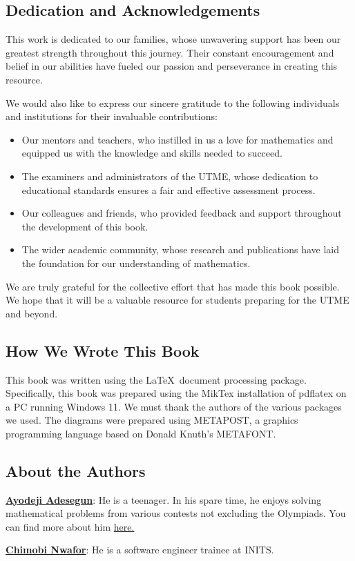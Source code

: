 \documentclass[a4paper]{book}
\begin{document}
\begin{frontmatter}
\chapter*{Dedication and Acknowledgements}

This work is dedicated to our families, whose unwavering support has been our greatest strength throughout this journey. Their constant encouragement and belief in our abilities have fueled our passion and perseverance in creating this resource.

We would also like to express our sincere gratitude to the following individuals and institutions for their invaluable contributions:
\begin{itemize}
\item Our mentors and teachers, who instilled in us a love for mathematics and equipped us with the knowledge and skills needed to succeed.
\item The examiners and administrators of the UTME, whose dedication to educational standards ensures a fair and effective assessment process.
\item  Our colleagues and friends, who provided feedback and support throughout the development of this book.
\item The wider academic community, whose research and publications have laid the foundation for our understanding of mathematics.
\end{itemize}

We are truly grateful for the collective effort that has made this book possible. We hope that it will be a valuable resource for students preparing for the UTME and beyond.

\section*{How We Wrote This Book}
This book was written using the  \LaTeX \ document processing package. Specifically, this book was prepared using the MikTex installation of pdflatex on a PC running Windows 11. We must thank the authors of the various packages we used. The diagrams were prepared using METAPOST, a graphics programming language based on Donald Knuth's METAFONT.

\section*{About the Authors}
\begin{description}
\item \href{https://linkedin.com/in/ayodejiades}{\textbf{Ayodeji Adesegun}}: He is a teenager. In his spare time, he enjoys solving mathematical problems from various contests not excluding the Olympiads. You can find more about him \href{https://ayodejiades.vercel.app}{here.}
\item \href{https://linkedin.com/in/jeremaih-nwafor}{\textbf{Chimobi Nwafor}}: He is a software engineer trainee at INITS. 
\end{description}


\end{frontmatter}
\end{document}
